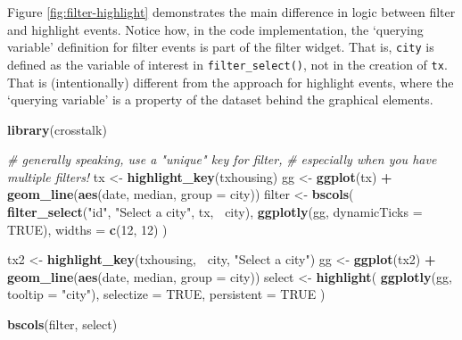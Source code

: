 \documentclass[
  12pt,
]{krantz}
\newenvironment{Shaded}{\begin{snugshade}}{\end{snugshade}}
\newcommand{\CommentTok}[1]{\textcolor[rgb]{0.56,0.35,0.01}{\textit{#1}}}
\newcommand{\DataTypeTok}[1]{\textcolor[rgb]{0.13,0.29,0.53}{#1}}
\newcommand{\DecValTok}[1]{\textcolor[rgb]{0.00,0.00,0.81}{#1}}
\newcommand{\KeywordTok}[1]{\textcolor[rgb]{0.13,0.29,0.53}{\textbf{#1}}}
\newcommand{\NormalTok}[1]{#1}
\newcommand{\OperatorTok}[1]{\textcolor[rgb]{0.81,0.36,0.00}{\textbf{#1}}}
\newcommand{\OtherTok}[1]{\textcolor[rgb]{0.56,0.35,0.01}{#1}}
\newcommand{\StringTok}[1]{\textcolor[rgb]{0.31,0.60,0.02}{#1}}
\begin{document}
Figure \ref{fig:filter-highlight} demonstrates the main difference in logic between filter and highlight events. Notice how, in the code implementation, the `querying variable' definition for filter events is part of the filter widget. That is, \texttt{city} is defined as the variable of interest in \texttt{filter\_select()}, not in the creation of \texttt{tx}. That is (intentionally) different from the approach for highlight events, where the `querying variable' is a property of the dataset behind the graphical elements.

\begin{Shaded}
\begin{Highlighting}[]
\KeywordTok{library}\NormalTok{(crosstalk)}

\CommentTok{# generally speaking, use a "unique" key for filter, }
\CommentTok{# especially when you have multiple filters!}
\NormalTok{tx <-}\StringTok{ }\KeywordTok{highlight_key}\NormalTok{(txhousing)}
\NormalTok{gg <-}\StringTok{ }\KeywordTok{ggplot}\NormalTok{(tx) }\OperatorTok{+}\StringTok{ }\KeywordTok{geom_line}\NormalTok{(}\KeywordTok{aes}\NormalTok{(date, median, }\DataTypeTok{group =}\NormalTok{ city))}
\NormalTok{filter <-}\StringTok{ }\KeywordTok{bscols}\NormalTok{(}
  \KeywordTok{filter_select}\NormalTok{(}\StringTok{"id"}\NormalTok{, }\StringTok{"Select a city"}\NormalTok{, tx, }\OperatorTok{~}\NormalTok{city),}
  \KeywordTok{ggplotly}\NormalTok{(gg, }\DataTypeTok{dynamicTicks =} \OtherTok{TRUE}\NormalTok{),}
  \DataTypeTok{widths =} \KeywordTok{c}\NormalTok{(}\DecValTok{12}\NormalTok{, }\DecValTok{12}\NormalTok{)}
\NormalTok{)}

\NormalTok{tx2 <-}\StringTok{ }\KeywordTok{highlight_key}\NormalTok{(txhousing, }\OperatorTok{~}\NormalTok{city, }\StringTok{"Select a city"}\NormalTok{)}
\NormalTok{gg <-}\StringTok{ }\KeywordTok{ggplot}\NormalTok{(tx2) }\OperatorTok{+}\StringTok{ }\KeywordTok{geom_line}\NormalTok{(}\KeywordTok{aes}\NormalTok{(date, median, }\DataTypeTok{group =}\NormalTok{ city))}
\NormalTok{select <-}\StringTok{ }\KeywordTok{highlight}\NormalTok{(}
  \KeywordTok{ggplotly}\NormalTok{(gg, }\DataTypeTok{tooltip =} \StringTok{"city"}\NormalTok{), }
  \DataTypeTok{selectize =} \OtherTok{TRUE}\NormalTok{, }\DataTypeTok{persistent =} \OtherTok{TRUE}
\NormalTok{)}

\KeywordTok{bscols}\NormalTok{(filter, select)}
\end{Highlighting}
\end{Shaded}
\end{document}
